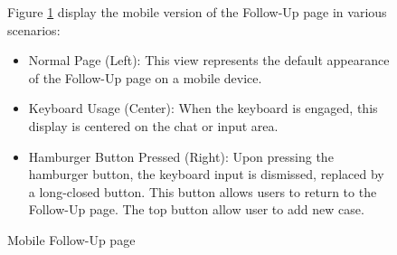 \documentclass[12pt,oneside,openright,a4paper]{cpe-english-project}
\begin{document}
\begin{figure}[!h]
\begin{minipage}{.15\textwidth}
      \end{minipage}
      \caption{Mobile Follow-Up page}\label{fig:Mob_Follow}
      \begin{justify}
        \qquad Figure \ref{fig:Mob_Follow} display the mobile version of the Follow-Up page in various scenarios:  \par
        \begin{itemize}
          \item Normal Page (Left): This view represents the default appearance of the Follow-Up page on a mobile device.
          \item Keyboard Usage (Center): When the keyboard is engaged, this display is centered on the chat or input area.
          \item Hamburger Button Pressed (Right): Upon pressing the hamburger button, the keyboard input is dismissed, replaced by a long-closed button. This button allows users to return to the Follow-Up page. The top button allow user to add new case.
        \end{itemize}
      \end{justify}
    \end{figure}
\end{document}
